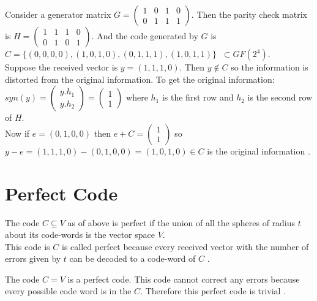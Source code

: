 \begin{example}
  Consider a generator matrix \(G=\begin{pmatrix}
    1 & 0 & 1 & 0\\
    0 & 1 & 1 & 1
  \end{pmatrix}\). Then the parity check matrix is \(H=\begin{pmatrix}
    1 & 1 & 1 & 0\\
    0 & 1 & 0 & 1
  \end{pmatrix}\). And the code generated by \(G\) is  \(C=\{(0,0,0,0),(1,0,1,0),(0,1,1,1),(1,0,1,1)\} \;\; \subset GF(2^{4})\).\\

  Suppose the received vector is \(y=(1,1,1,0)\). Then \(y \not \in C\) so the information is distorted from the original information. To get the original information:\\
  \(syn(y)= \begin{pmatrix}
    y.h_1 \\ y.h_2
  \end{pmatrix} = \begin{pmatrix}
    1 \\ 1
  \end{pmatrix}\) where \(h_1\) is the first row and \(h_2\) is the second row of \(H\).\\
  Now if \(e=(0,1,0,0)\) then \(e+C=\begin{pmatrix}
    1 \\ 1
  \end{pmatrix}\) so \(y-e=(1,1,1,0)-(0,1,0,0)=(1,0,1,0) \in C\) is the original information \cite{error_correct}.

\end{example}


\section{Perfect Code}
The code \(C \subseteq V\) as of above is perfect if the union of all the spheres of radius \(t\) about its code-words is the vector space \(V\).\\
This code is \(C\) is called perfect because every received vector with the number of errors given by \(t\) can be decoded to a code-word of \(C\) \cite{error_correct}.

\begin{example}
  The code \(C=V\) is a perfect code. This code cannot correct any errors because every possible code word is in the \(C\). Therefore this perfect code is trivial \cite{error_correct}.
\end{example}

